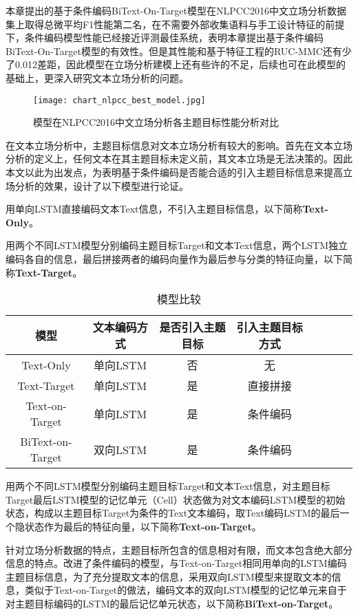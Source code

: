 本章提出的基于条件编码BiText-On-Target模型在NLPCC2016中文立场分析数据集上取得总微平均F1性能第二名，在不需要外部收集语料与手工设计特征的前提下，条件编码模型性能已经接近评测最佳系统，表明本章提出基于条件编码BiText-On-Target模型的有效性。但是其性能和基于特征工程的RUC-MMC还有少了0.012差距，因此模型在立场分析建模上还有些许的不足，后续也可在此模型的基础上，更深入研究文本立场分析的问题。

\begin{figure}[htbp]
	\centering
	\texttt{[image: chart\_nlpcc\_best\_model.jpg]}
	\caption[rnn_vanish]{模型在NLPCC2016中文立场分析各主题目标性能分析对比}
	\label{chart_nlpcc_best_model}
\end{figure}

在文本立场分析中，主题目标信息对文本立场分析有较大的影响。首先在文本立场分析的定义上，任何文本在其主题目标未定义前，其文本立场是无法决策的。因此本文以此为出发点，为表明基于条件编码是否能合适的引入主题目标信息来提高立场分析的效果，设计了以下模型进行论证。

用单向LSTM直接编码文本Text信息，不引入主题目标信息，以下简称\textbf{Text-Only}。


用两个不同LSTM模型分别编码主题目标Target和文本Text信息，两个LSTM独立编码各自的信息，最后拼接两者的编码向量作为最后参与分类的特征向量，以下简称\textbf{Text-Target}。

\begin{table}[htbp]
	\caption[table123]{模型比较}
	\label{model_list}
	\vspace{0.5em}\centering\wuhao
	\begin{tabular}{cccccccc}
		\toprule[1.5pt]
		模型&文本编码方式&是否引入主题目标&引入主题目标方式 \\
		\midrule[1pt]
		Text-Only&单向LSTM&否&无\\
		Text-Target&单向LSTM&是&直接拼接\\
		Text-on-Target&单向LSTM&是&条件编码\\
		BiText-on-Target&双向LSTM&是&条件编码\\
		\bottomrule[1.5pt]
	\end{tabular}
\end{table}
用两个不同LSTM模型分别编码主题目标Target和文本Text信息，对主题目标Target最后LSTM模型的记忆单元（Cell）状态做为对文本编码LSTM模型的初始状态，构成以主题目标Target为条件的Text文本编码，取Text编码LSTM的最后一个隐状态作为最后的特征向量，以下简称\textbf{Text-on-Target}。

针对立场分析数据的特点，主题目标所包含的信息相对有限，而文本包含绝大部分信息的特点。改进了条件编码的模型，与Text-on-Target相同用单向的LSTM编码主题目标信息，为了充分提取文本的信息，采用双向LSTM模型来提取文本的信息，类似于Text-on-Target的做法，编码文本的双向LSTM模型的记忆单元来自于对主题目标编码的LSTM的最后记忆单元状态，以下简称\textbf{BiText-on-Target}。

